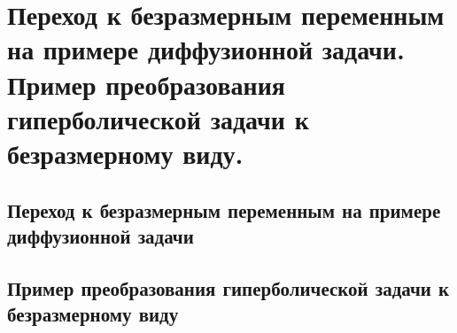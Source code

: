 \chapter{Переход к безразмерным переменным на примере диффузионной задачи.
Пример преобразования гиперболической задачи к безразмерному виду.}

\section{Переход к безразмерным переменным на примере диффузионной задачи}
\section{Пример преобразования гиперболической задачи к безразмерному виду}
\newpage
